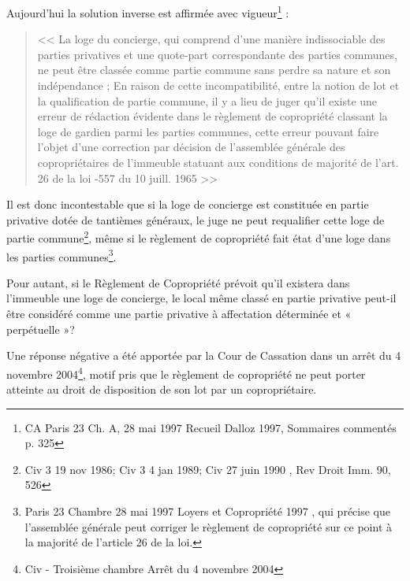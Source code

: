 		Aujourd’hui la solution inverse est affirmée avec vigueur\footnote{CA Paris 23\degre{} Ch. A, 28 mai 1997 Recueil Dalloz 1997, Sommaires commentés p. 325} :
		\begin{quote}
			<< La loge du concierge, qui comprend d'une manière indissociable des parties privatives et une
			quote-part correspondante des parties communes, ne peut être classée comme partie
			commune sans perdre sa nature et son indépendance ; En raison de cette incompatibilité, entre
			la notion de lot et la qualification de partie commune, il y a lieu de juger qu'il existe une erreur
			de rédaction évidente dans le règlement de copropriété classant la loge de gardien parmi les
			parties communes, cette erreur pouvant faire l'objet d'une correction par décision de
			l'assemblée générale des copropriétaires de l'immeuble statuant aux conditions de majorité de
			l'art. 26 de la loi -557 du 10 juill. 1965 >>
		\end{quote}
	
		Il est donc incontestable que si la loge de concierge est constituée en partie privative dotée de tantièmes
		généraux, le juge ne peut requalifier cette loge de partie commune\footnote{Civ 3\degre{} 19 nov 1986; Civ 3\degre{} 4 jan 1989; Civ 27 juin 1990 , Rev Droit Imm. 90, 526}, même si le règlement de copropriété
		fait état d’une loge dans les parties communes\footnote{Paris 23\degre{} Chambre 28 mai 1997 Loyers et Copropriété 1997 , qui précise que l’assemblée générale peut corriger le règlement de copropriété sur ce point à la majorité de l’article 26 de la loi.}.
		
		Pour autant, si le Règlement de Copropriété prévoit qu'il existera dans l'immeuble une loge de concierge,
		le local même classé en partie privative peut-il être considéré comme une partie privative à affectation
		déterminée et « perpétuelle »?
		
		Une réponse négative a été apportée par la Cour de Cassation dans un arrêt du 4 novembre 2004\footnote{Civ - Troisième chambre Arrêt  du 4 novembre 2004}, motif
		pris que le règlement de copropriété ne peut porter atteinte au droit de disposition de son lot par un
		copropriétaire.
		
